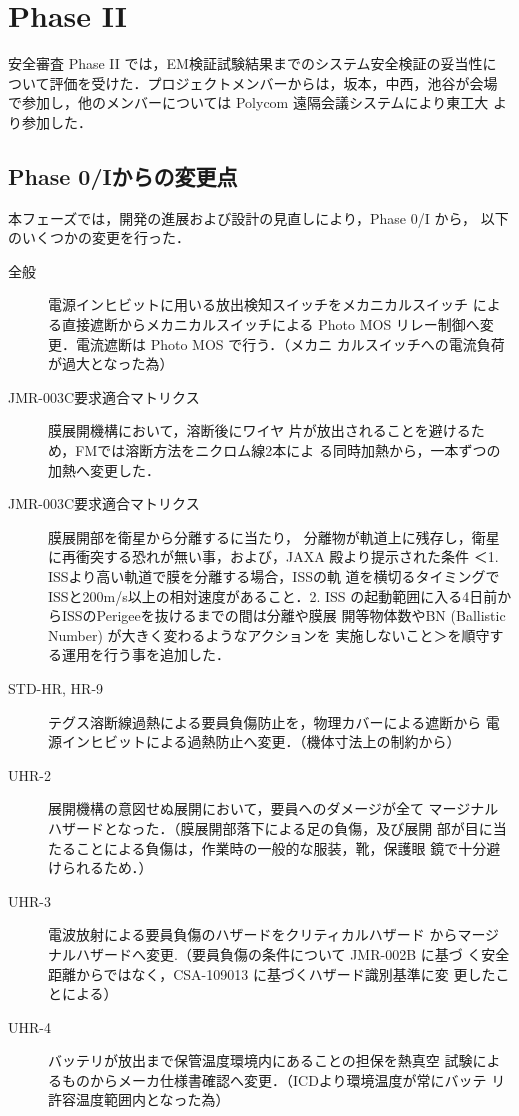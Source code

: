 \section{Phase II}

安全審査 Phase II では，EM検証試験結果までのシステム安全検証の妥当性に
ついて評価を受けた．プロジェクトメンバーからは，坂本，中西，池谷が会場
で参加し，他のメンバーについては Polycom 遠隔会議システムにより東工大
より参加した．

\subsection{Phase 0/Iからの変更点}

本フェーズでは，開発の進展および設計の見直しにより，Phase 0/I から，
以下のいくつかの変更を行った．

\begin{description}
  \item[全般] 電源インヒビットに用いる放出検知スイッチをメカニカルスイッチ
  による直接遮断からメカニカルスイッチによる
  Photo MOS リレー制御へ変更．電流遮断は Photo MOS で行う．（メカニ
    カルスイッチへの電流負荷が過大となった為）
  \item[JMR-003C要求適合マトリクス] 膜展開機構において，溶断後にワイヤ
    片が放出されることを避けるため，FMでは溶断方法をニクロム線2本によ
    る同時加熱から，一本ずつの加熱へ変更した．
  \item[JMR-003C要求適合マトリクス] 膜展開部を衛星から分離するに当たり，
    分離物が軌道上に残存し，衛星に再衝突する恐れが無い事，および，JAXA
    殿より提示された条件 ＜1. ISSより高い軌道で膜を分離する場合，ISSの軌
    道を横切るタイミングでISSと200m/s以上の相対速度があること．2. ISS
    の起動範囲に入る4日前からISSのPerigeeを抜けるまでの間は分離や膜展
    開等物体数やBN (Ballistic Number) が大きく変わるようなアクションを
    実施しないこと＞を順守する運用を行う事を追加した．    
  \item[STD-HR, HR-9] テグス溶断線過熱による要員負傷防止を，物理カバーによる遮断から
    電源インヒビットによる過熱防止へ変更．（機体寸法上の制約から）
  \item[UHR-2] 展開機構の意図せぬ展開において，要員へのダメージが全て
    マージナルハザードとなった．（膜展開部落下による足の負傷，及び展開
      部が目に当たることによる負傷は，作業時の一般的な服装，靴，保護眼
      鏡で十分避けられるため．）
  \item[UHR-3] 電波放射による要員負傷のハザードをクリティカルハザード
    からマージナルハザードへ変更.（要員負傷の条件について JMR-002B に基づ
      く安全距離からではなく，CSA-109013 に基づくハザード識別基準に変
      更したことによる）
\item[UHR-4] バッテリが放出まで保管温度環境内にあることの担保を熱真空
  試験によるものからメーカ仕様書確認へ変更．（ICDより環境温度が常にバッテ
    リ許容温度範囲内となった為）

\end{description}

